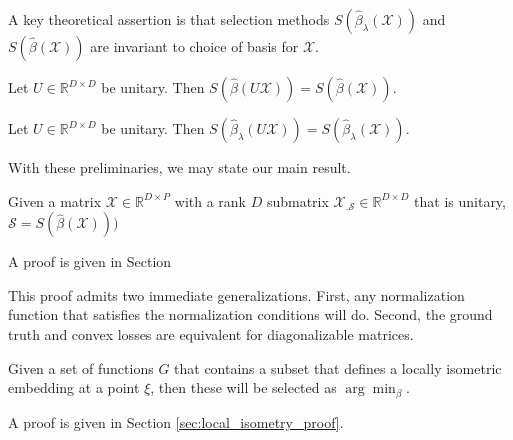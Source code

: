 A key theoretical assertion is that selection methods $S(\widehat {\beta}_{\lambda} (\mathcal X))$ and $S(\widehat {\beta} (\mathcal X))$ are invariant to choice of basis for $\mathcal X$.

\begin{proposition}
\label{prop:basis_pursuit_selection_equivalence}
Let $U \in \mathbb R^{D \times D}$ be unitary.
 Then $S(\widehat \beta  (U \mathcal X)) = S(\widehat \beta (\mathcal X))$.
\end{proposition}

\begin{proposition}
\label{prop:lasso_selection_equivalence}
Let $U \in \mathbb R^{D \times D}$ be unitary.
 Then $S(\widehat \beta_{\lambda}  (U \mathcal X)) = S(\widehat \beta_{\lambda} (\mathcal X))$.
\end{proposition}


With these preliminaries, we may state our main result.

\begin{proposition}
\label{prop:unitary_selection}
Given a matrix $\mathcal X \in \mathbb R^{D \times P}$ with a rank $D$ submatrix $\mathcal X_{.\mathcal S} \in \mathbb R^{D \times D}$ that is unitary, $\mathcal S = S(\widehat{\beta} (\mathcal X)))$
 \end{proposition}
 
 A proof is given in Section 
 
This proof admits two immediate generalizations.
First, any normalization function that satisfies the normalization conditions will do.
Second, the ground truth and convex losses are equivalent for diagonalizable matrices.
 
\begin{proposition}
\label{prop:local_isometry}
Given a set of functions $G$ that contains a subset that defines a locally isometric embedding at a point $\xi$, then these will be selected as $\arg \min_\beta$.
\end{proposition}
A proof is given in Section \ref{sec:local_isometry_proof}.


